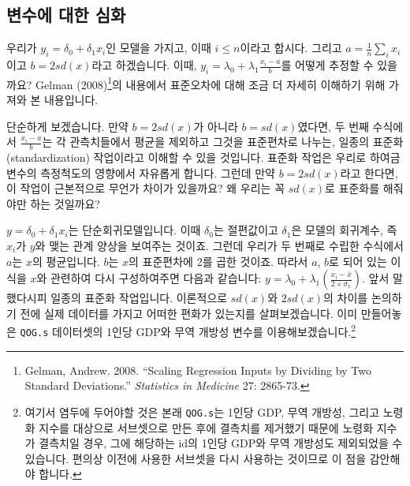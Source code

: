 \documentclass[
]{book}
\begin{document}
\hypertarget{uxbcc0uxc218uxc5d0-uxb300uxd55c-uxc2ecuxd654}{%
\subsection{변수에 대한 심화}\label{uxbcc0uxc218uxc5d0-uxb300uxd55c-uxc2ecuxd654}}

우리가 \(y_i = \delta_0 + \delta_1 x_i\)인 모델을 가지고, 이때 \(i \leq n\)이라고 합시다. 그리고 \(a = \frac{1}{n}\sum_i x_i\)이고 \(b=2sd(x)\)라고 하겠습니다. 이때, \(y_i = \lambda_0 + \lambda_1\frac{x_i -a}{b}\)를 어떻게 추정할 수 있을까요? Gelman (2008)\footnote{Gelman, Andrew. 2008. ``Scaling Regression Inputs by Dividing by Two Standard Deviations.'' \emph{Statistics in Medicine} 27: 2865-73.}의 내용에서 표준오차에 대해 조금 더 자세히 이해하기 위해 가져와 본 내용입니다.

단순하게 보겠습니다. 만약 \(b = 2sd(x)\)가 아니라 \(b=sd(x)\)였다면, 두 번째 수식에서 \(\frac{x_i-a}{b}\)는 각 관측치들에서 평균을 제외하고 그것을 표준편차로 나누는, 일종의 표준화(standardization) 작업이라고 이해할 수 있을 것입니다. 표준화 작업은 우리로 하여금 변수의 측정척도의 영향에서 자유롭게 합니다. 그런데 만약 \(b=2sd(x)\)라고 한다면, 이 작업이 근본적으로 무언가 차이가 있을까요? 왜 우리는 꼭 \(sd(x)\)로 표준화를 해줘야만 하는 것일까요?

\(y = \delta_0 + \delta_1 x_i\)는 단순회귀모델입니다. 이때 \(\delta_0\)는 절편값이고 \(\delta_1\)은 모델의 회귀계수, 즉 \(x_i\)가 \(y\)와 맺는 관계 양상을 보여주는 것이죠. 그런데 우리가 두 번째로 수립한 수식에서 \(a\)는 \(x\)의 평균입니다. \(b\)는 \(x\)의 표준편차에 2를 곱한 것이죠. 따라서 \(a\), \(b\)로 되어 있는 이 식을 \(x\)와 관련하여 다시 구성하여주면 다음과 같습니다: \(y = \lambda_0 + \lambda_1(\frac{x_i - \bar{x}}{2\times\sigma_x})\). 앞서 말했다시피 일종의 표준화 작업입니다. 이론적으로 \(sd(x)\)와 \(2sd(x)\)의 차이를 논의하기 전에 실제 데이터를 가지고 어떠한 편화가 있는지를 살펴보겠습니다. 이미 만들어놓은 \texttt{QOG.s} 데이터셋의 1인당 GDP와 무역 개방성 변수를 이용해보겠습니다.\footnote{여기서 염두에 두어야할 것은 본래 \texttt{QOG.s}는 1인당 GDP, 무역 개방성, 그리고 노령화 지수를 대상으로 서브셋으로 만든 후에 결측치를 제거했기 때문에 노령화 지수가 결측치일 경우, 그에 해당하는 id의 1인당 GDP와 무역 개방성도 제외되었을 수 있습니다. 편의상 이전에 사용한 서브셋을 다시 사용하는 것이므로 이 점을 감안해야 합니다.}
\end{document}
